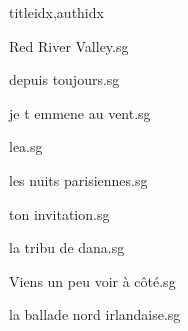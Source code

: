 \documentclass[
    ]{article}
\begin{document}
\begin{songs}{titleidx,authidx}

{Red River Valley.sg}


{depuis toujours.sg}


{je t emmene au vent.sg}


{lea.sg}


{les nuits parisiennes.sg}


{ton invitation.sg}


{la tribu de dana.sg}


{Viens un peu voir à côté.sg}


{la ballade nord irlandaise.sg}


\end{songs}
\end{document}

